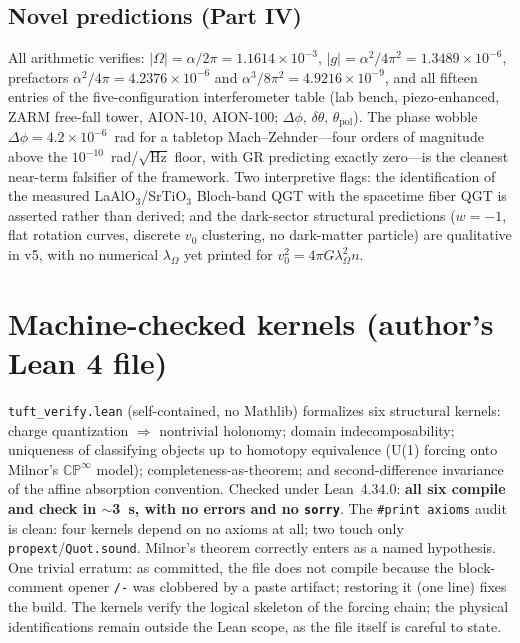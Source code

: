 \documentclass[11pt,letterpaper]{article}
\begin{document}
\subsection{Novel predictions (Part IV)}
\label{sec:partiv}

All arithmetic verifies: $|\Omega|=\alpha/2\pi=1.1614\times10^{-3}$,
$|g|=\alpha^2/4\pi^2=1.3489\times10^{-6}$, prefactors $\alpha^2/4\pi=
4.2376\times10^{-6}$ and $\alpha^3/8\pi^2=4.9216\times10^{-9}$, and all
fifteen entries of the five-configuration interferometer table (lab bench,
piezo-enhanced, ZARM free-fall tower, AION-10, AION-100; $\Delta\phi$,
$\delta\theta$, $\theta_{\mathrm{pol}}$). The phase wobble $\Delta\phi=
4.2\times10^{-6}$~rad for a tabletop Mach--Zehnder---four orders of magnitude
above the $10^{-10}$~rad/$\sqrt{\mathrm{Hz}}$ floor, with GR predicting
exactly zero---is the cleanest near-term falsifier of the framework. Two
interpretive flags: the identification of the measured LaAlO$_3$/SrTiO$_3$
Bloch-band QGT with the spacetime fiber QGT is asserted rather than derived;
and the dark-sector structural predictions ($w=-1$, flat rotation curves,
discrete $v_0$ clustering, no dark-matter particle) are qualitative in v5,
with no numerical $\lambda_\Omega$ yet printed for
$v_0^2=4\pi G\lambda_\Omega^2 n$.

\section{Machine-checked kernels (author's Lean 4 file)}
\label{sec:lean}

\texttt{tuft\_verify.lean} (self-contained, no Mathlib) formalizes six
structural kernels: charge quantization $\Rightarrow$ nontrivial holonomy;
domain indecomposability; uniqueness of classifying objects up to homotopy
equivalence (U(1) forcing onto Milnor's $\mathbb{CP}^\infty$ model);
completeness-as-theorem; and second-difference invariance of the affine
absorption convention. Checked under Lean~4.34.0: \textbf{all six compile and
check in $\sim$3~s, with no errors and no \texttt{sorry}}. The
\texttt{\#print axioms} audit is clean: four kernels depend on no axioms at
all; two touch only \texttt{propext}/\texttt{Quot.sound}. Milnor's theorem
correctly enters as a named hypothesis. One trivial erratum: as committed,
the file does not compile because the block-comment opener \texttt{/-} was
clobbered by a paste artifact; restoring it (one line) fixes the build. The
kernels verify the logical skeleton of the forcing chain; the physical
identifications remain outside the Lean scope, as the file itself is careful
to state.
\end{document}
